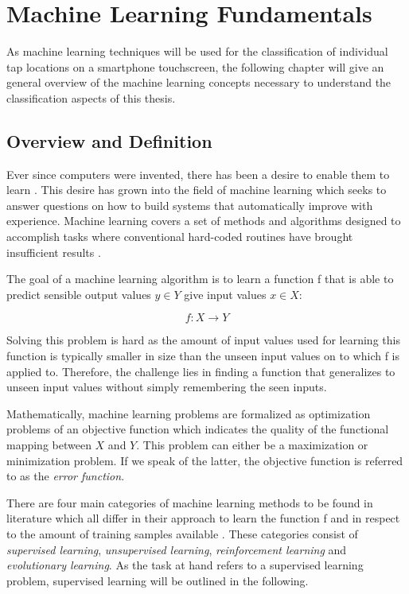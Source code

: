 \chapter{Machine Learning Fundamentals}
As machine learning techniques will be used for the classification of individual tap locations on a smartphone touchscreen, the following chapter will give an general overview of the machine learning concepts necessary to understand the classification aspects of this thesis.

\section{Overview and Definition}

Ever since computers were invented, there has been a desire to enable them to learn \cite{samuel2000some}. This desire has grown into the field of machine learning which seeks to answer questions on how to build systems that automatically improve with experience. Machine learning covers a set of methods and algorithms designed to accomplish tasks where conventional hard-coded routines have brought insufficient results \cite{mitchell2006discipline}.

The goal of a machine learning algorithm is to learn a function f that is able to predict sensible output values $y \in Y$ give input values $x \in X$:

\begin{equation}
  f: X \rightarrow Y
\end{equation}

Solving this problem is hard as the amount of input values used for learning this function is typically smaller in size than the unseen input values on to which f is applied to. Therefore, the challenge lies in finding a function that generalizes to unseen input values without simply remembering the seen inputs.

Mathematically, machine learning problems are formalized as optimization problems of an objective function which indicates the quality of the functional mapping between $X$ and $Y$. This problem can either be a maximization or minimization problem. If we speak of the latter, the objective function is referred to as the \textit{error function}.

There are four main categories of machine learning methods to be found in literature which all differ in their approach to learn the function f and in respect to the amount of training samples available \cite{Duda:2000:PC:954544, Marsland:2009:MLA:1571643}. These categories consist of \textit{supervised learning}, \textit{unsupervised learning}, \textit{reinforcement learning} and \textit{evolutionary learning}. As the task at hand refers to a supervised learning problem, supervised learning will be outlined in the following.

